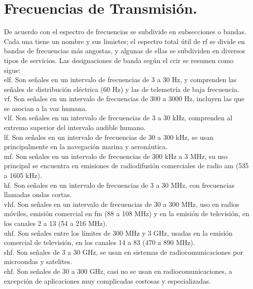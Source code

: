 \section*{\fontsize{12}{18}\selectfont Frecuencias de Transmisión.}

\begin{justify}
    De acuerdo con \textcite{tomasi2003sistemas} el espectro de frecuencias se subdivide en subsecciones o bandas. Cada una tiene un nombre y sus limietes;
    el espectro total útil de \gls{rf} se divide en bandas de frecuencias más angostas, y algunas de ellas se
    subdividen en diversos tipos de servicios. Las designaciones de banda según el \gls{ccir} se resumen como sigue:\\

    \gls{elf}. Son señales en un intervalo de frecuencias de 3 a 30 Hz, y comprenden las señales de distribución eléctrica
    (60 Hz) y las de telemetría de baja frecuencia.\\

    \gls{vf}. Son señales en un intervalo de frecuencias de 300 a 3000 Hz, incluyen las que se asocian a la voz humana.\\

    \gls{vlf}. Son señales en un intervalo de frecuencias de 3 a 30 kHz, comprenden al extremo superior del intervalo audible humano.\\

    \gls{lf}. Son señales en un intervalo de frecuencias de 30 a 300 kHz, se usan principalmente en la navegación marina y aeronáutica.\\

    \gls{mf}. Son señales en un intervalo de frecuencias de 300 kHz a 3 MHz, su uso principal se encuentra en emisiones de radiodifusión comerciales
    de radio \gls{am} (535 a 1605 kHz).\\

    \gls{hf}. Son señales en un intervalo de frecuencias de 3 a 30 MHz, con frecuencias llamadas ondas cortas.\\

    \gls{vhf}. Son señales en un intervalo de frecuencias de 30 a 300 MHz, uso en radios móviles, emisión comercial en \gls{fm} (88 a 108 MHz) y en la
    emisión de televisión, en los canales 2 a 13 (54 a 216 MHz).\\

    \gls{uhf}. Son señales entre los límites de 300 MHz y 3 GHz, usadas en la emisión comercial de televisión, en los canales 14 a 83 (470 a 890 MHz).\\

    \gls{shf}. Son señales de 3 a 30 GHz, se usan en sistemas de radiocomunicaciones por microondas y satelites.\\

    \gls{ehf}. Son señales de 30 a 300 GHz, casi no se usan en radiocomunicaciones, a excepción de aplicaciones muy complicadas
    costosas y especializadas.\\
\end{justify}

